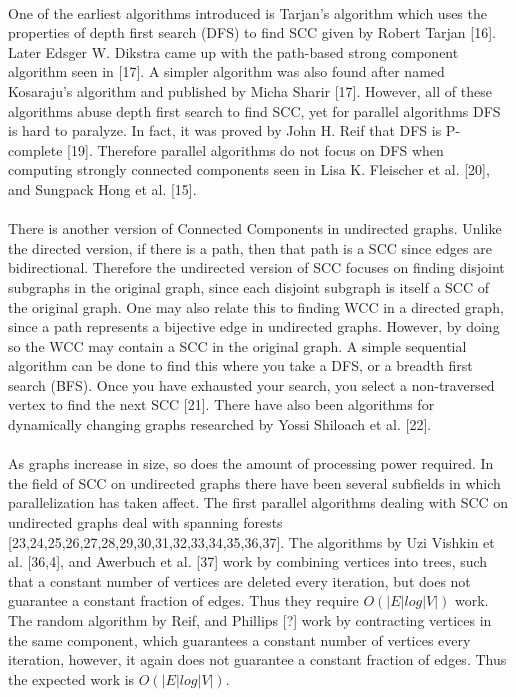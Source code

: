 \documentclass[]{article}
\begin{document}
 
 
 \paragraph{}
 One of the earliest algorithms introduced is Tarjan's algorithm which uses the properties of depth first search (DFS) to find SCC given by Robert Tarjan [16]. Later  Edsger W. Dikstra came up with the path-based strong component algorithm seen in [17]. A simpler algorithm was also found after named Kosaraju's algorithm and published by Micha Sharir [17]. However, all of these algorithms abuse depth first search to find SCC, yet for parallel algorithms DFS is hard to paralyze. In fact, it was proved by John H. Reif that DFS is P-complete [19]. Therefore parallel algorithms do not focus on DFS when computing strongly connected components seen in Lisa K. Fleischer et al. [20], and Sungpack Hong et al. [15].
 
 \paragraph{}
 There is another version of Connected Components in undirected graphs. Unlike the directed version, if there is a path, then that path is a SCC since edges are bidirectional. Therefore the undirected version of SCC focuses on finding disjoint subgraphs in the original graph, since each disjoint subgraph is itself a SCC of the original graph. One may also relate this to finding WCC in a directed graph, since a path represents a bijective edge in undirected graphs. However, by doing so the WCC may contain a SCC in the original graph. A simple sequential algorithm can be done to find this where you take a DFS, or a breadth first search (BFS). Once you have exhausted your search, you select a non-traversed vertex to find the next SCC [21]. There have also been algorithms for dynamically changing graphs researched by Yossi Shiloach et al. [22].
 
 \paragraph{}
 As graphs increase in size, so does the amount of processing power required. In the field of SCC on undirected graphs there have been several subfields in which parallelization has taken affect.  The first parallel algorithms dealing with SCC on undirected graphs deal with spanning forests [23,24,25,26,27,28,29,30,31,32,33,34,35,36,37]. The algorithms by Uzi Vishkin et al. [36,4], and Awerbuch et al. [37] work by combining vertices into trees, such that a constant number of vertices are deleted every iteration, but does not guarantee a constant fraction of edges. Thus they require $O(|E| log |V|)$ work. The random algorithm by Reif, and Phillips [?] work by contracting vertices in the same component, which guarantees a constant number of vertices every iteration, however, it again does not guarantee a constant fraction of edges. Thus the expected work is $O(|E| log |V|)$.
 
\end{document}
